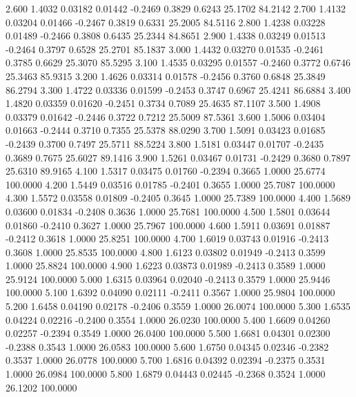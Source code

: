    2.600   1.4032   0.03182   0.01442  -0.2469   0.3829   0.6243  25.1702  84.2142
   2.700   1.4132   0.03204   0.01466  -0.2467   0.3819   0.6331  25.2005  84.5116
   2.800   1.4238   0.03228   0.01489  -0.2466   0.3808   0.6435  25.2344  84.8651
   2.900   1.4338   0.03249   0.01513  -0.2464   0.3797   0.6528  25.2701  85.1837
   3.000   1.4432   0.03270   0.01535  -0.2461   0.3785   0.6629  25.3070  85.5295
   3.100   1.4535   0.03295   0.01557  -0.2460   0.3772   0.6746  25.3463  85.9315
   3.200   1.4626   0.03314   0.01578  -0.2456   0.3760   0.6848  25.3849  86.2794
   3.300   1.4722   0.03336   0.01599  -0.2453   0.3747   0.6967  25.4241  86.6884
   3.400   1.4820   0.03359   0.01620  -0.2451   0.3734   0.7089  25.4635  87.1107
   3.500   1.4908   0.03379   0.01642  -0.2446   0.3722   0.7212  25.5009  87.5361
   3.600   1.5006   0.03404   0.01663  -0.2444   0.3710   0.7355  25.5378  88.0290
   3.700   1.5091   0.03423   0.01685  -0.2439   0.3700   0.7497  25.5711  88.5224
   3.800   1.5181   0.03447   0.01707  -0.2435   0.3689   0.7675  25.6027  89.1416
   3.900   1.5261   0.03467   0.01731  -0.2429   0.3680   0.7897  25.6310  89.9165
   4.100   1.5317   0.03475   0.01760  -0.2394   0.3665   1.0000  25.6774 100.0000
   4.200   1.5449   0.03516   0.01785  -0.2401   0.3655   1.0000  25.7087 100.0000
   4.300   1.5572   0.03558   0.01809  -0.2405   0.3645   1.0000  25.7389 100.0000
   4.400   1.5689   0.03600   0.01834  -0.2408   0.3636   1.0000  25.7681 100.0000
   4.500   1.5801   0.03644   0.01860  -0.2410   0.3627   1.0000  25.7967 100.0000
   4.600   1.5911   0.03691   0.01887  -0.2412   0.3618   1.0000  25.8251 100.0000
   4.700   1.6019   0.03743   0.01916  -0.2413   0.3608   1.0000  25.8535 100.0000
   4.800   1.6123   0.03802   0.01949  -0.2413   0.3599   1.0000  25.8824 100.0000
   4.900   1.6223   0.03873   0.01989  -0.2413   0.3589   1.0000  25.9124 100.0000
   5.000   1.6315   0.03964   0.02040  -0.2413   0.3579   1.0000  25.9446 100.0000
   5.100   1.6392   0.04090   0.02111  -0.2411   0.3567   1.0000  25.9804 100.0000
   5.200   1.6458   0.04190   0.02178  -0.2406   0.3559   1.0000  26.0074 100.0000
   5.300   1.6535   0.04224   0.02216  -0.2400   0.3554   1.0000  26.0230 100.0000
   5.400   1.6609   0.04260   0.02257  -0.2394   0.3549   1.0000  26.0400 100.0000
   5.500   1.6681   0.04301   0.02300  -0.2388   0.3543   1.0000  26.0583 100.0000
   5.600   1.6750   0.04345   0.02346  -0.2382   0.3537   1.0000  26.0778 100.0000
   5.700   1.6816   0.04392   0.02394  -0.2375   0.3531   1.0000  26.0984 100.0000
   5.800   1.6879   0.04443   0.02445  -0.2368   0.3524   1.0000  26.1202 100.0000
